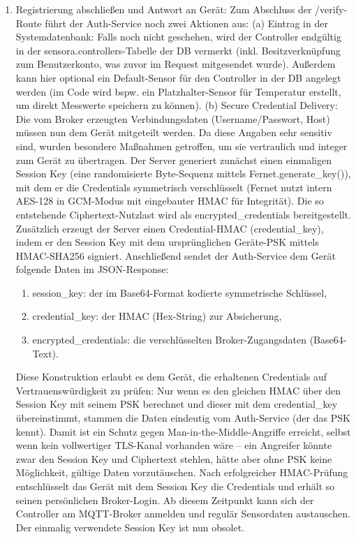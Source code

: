 \begin{enumerate}
    \item Registrierung abschließen und Antwort an Gerät: Zum Abschluss der /verify-Route führt der Auth-Service noch zwei Aktionen aus: (a) Eintrag in der Systemdatenbank: Falls noch nicht geschehen, wird der Controller endgültig in der sensora.controllers-Tabelle der DB vermerkt (inkl. Besitzverknüpfung zum Benutzerkonto, was zuvor im Request mitgesendet wurde). Außerdem kann hier optional ein Default-Sensor für den Controller in der DB angelegt werden (im Code wird bspw. ein Platzhalter-Sensor für Temperatur erstellt, um direkt Messwerte speichern zu können). (b) Secure Credential Delivery: Die vom Broker erzeugten Verbindungsdaten (Username/Passwort, Host) müssen nun dem Gerät mitgeteilt werden. Da diese Angaben sehr sensitiv sind, wurden besondere Maßnahmen getroffen, um sie vertraulich und integer zum Gerät zu übertragen. Der Server generiert zunächst einen einmaligen Session Key (eine randomisierte Byte-Sequenz mittels Fernet.generate\_key()), mit dem er die Credentials symmetrisch verschlüsselt (Fernet nutzt intern AES-128 in GCM-Modus\cite{fernetSpec} mit eingebauter HMAC für Integrität). Die so entstehende Ciphertext-Nutzlast wird als encrypted\_credentials bereitgestellt. Zusätzlich erzeugt der Server einen Credential-HMAC (credential\_key), indem er den Session Key mit dem ursprünglichen Geräte-PSK mittels HMAC-SHA256 signiert. Anschließend sendet der Auth-Service dem Gerät folgende Daten im JSON-Response:
    \begin{enumerate}
        \item session\_key: der im Base64-Format kodierte symmetrische Schlüssel,
        \item credential\_key: der HMAC (Hex-String) zur Absicherung,
        \item encrypted\_credentials: die verschlüsselten Broker-Zugangsdaten (Base64-Text).
    \end{enumerate}
    Diese Konstruktion erlaubt es dem Gerät, die erhaltenen Credentials auf Vertrauenswürdigkeit zu prüfen: Nur wenn es den gleichen HMAC über den Session Key mit seinem PSK berechnet und dieser mit dem credential\_key übereinstimmt, stammen die Daten eindeutig vom Auth-Service (der das PSK kennt). Damit ist ein Schutz gegen Man-in-the-Middle-Angriffe erreicht, selbst wenn kein vollwertiger TLS-Kanal vorhanden wäre – ein Angreifer könnte zwar den Session Key und Ciphertext stehlen, hätte aber ohne PSK keine Möglichkeit, gültige Daten vorzutäuschen. Nach erfolgreicher HMAC-Prüfung entschlüsselt das Gerät mit dem Session Key die Credentials und erhält so seinen persönlichen Broker-Login. Ab diesem Zeitpunkt kann sich der Controller am MQTT-Broker anmelden und regulär Sensordaten austauschen. Der einmalig verwendete Session Key ist nun obsolet.
\end{enumerate}

